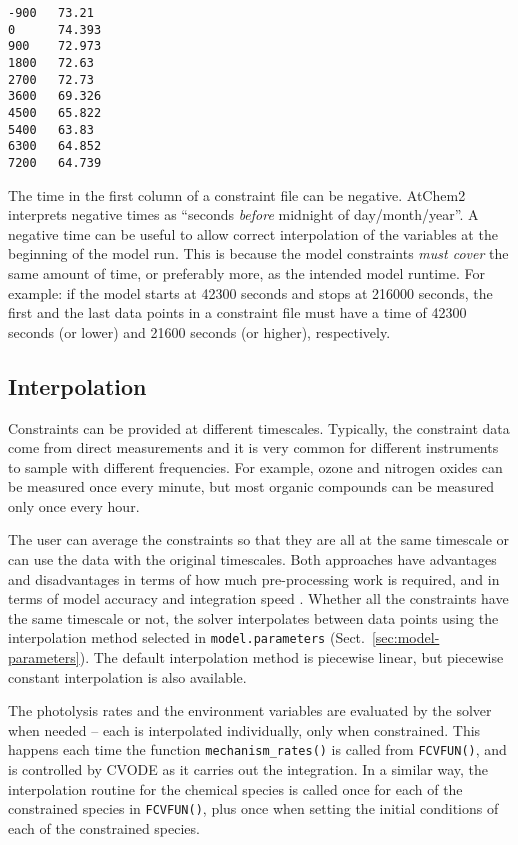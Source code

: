 \begin{verbatim}
-900   73.21
0      74.393
900    72.973
1800   72.63
2700   72.73
3600   69.326
4500   65.822
5400   63.83
6300   64.852
7200   64.739
\end{verbatim}

The time in the first column of a constraint file can be negative.
AtChem2 interprets negative times as ``seconds \emph{before} midnight
of day/month/year''. A negative time can be useful to allow correct
interpolation of the variables at the beginning of the model run. This
is because the model constraints \emph{must cover} the same amount of
time, or preferably more, as the intended model runtime. For example:
if the model starts at 42300 seconds and stops at 216000 seconds, the
first and the last data points in a constraint file must have a time
of 42300 seconds (or lower) and 21600 seconds (or higher),
respectively.

\subsection{Interpolation} \label{subsec:interpolation}

Constraints can be provided at different timescales. Typically, the
constraint data come from direct measurements and it is very common
for different instruments to sample with different frequencies. For
example, ozone and nitrogen oxides can be measured once every minute,
but most organic compounds can be measured only once every hour.

The user can average the constraints so that they are all at the same
timescale or can use the data with the original timescales. Both
approaches have advantages and disadvantages in terms of how much
pre-processing work is required, and in terms of model accuracy and
integration speed \citep{sommariva_2020}. Whether all the constraints
have the same timescale or not, the solver interpolates between data
points using the interpolation method selected in
\texttt{model.parameters} (Sect.~\ref{sec:model-parameters}). The
default interpolation method is piecewise linear, but piecewise
constant interpolation is also available.

The photolysis rates and the environment variables are evaluated by
the solver when needed -- each is interpolated individually, only when
constrained. This happens each time the function
\texttt{mechanism\_rates()} is called from \texttt{FCVFUN()}, and is
controlled by CVODE as it carries out the integration. In a
similar way, the interpolation routine for the chemical species is
called once for each of the constrained species in \texttt{FCVFUN()},
plus once when setting the initial conditions of each of the
constrained species.

